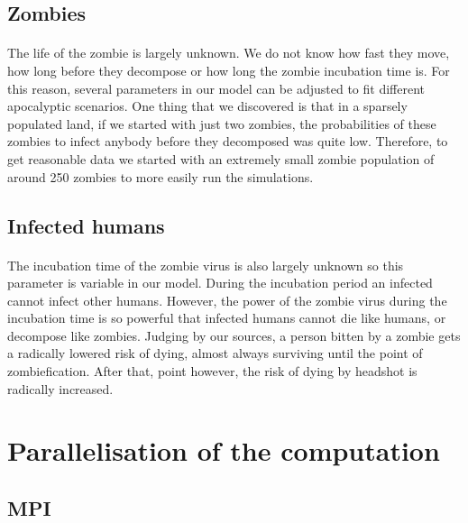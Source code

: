 \documentclass{article}
\begin{document}
\subsection{Zombies}
\paragraph{}
The life of the zombie is largely unknown. We do not know how fast they move, how long before they decompose or how long the zombie incubation time is. For this reason, several parameters in our model can be adjusted to fit different apocalyptic scenarios. One thing that we discovered is that in a sparsely populated land, if we started with just two zombies, the probabilities of these zombies to infect anybody before they decomposed was quite low. Therefore, to get reasonable data we started with an extremely small zombie population of around 250 zombies to more easily run the simulations.

\subsection{Infected humans}
\paragraph{}
The incubation time of the zombie virus is also largely unknown so this parameter is variable in our model. During the incubation period an infected cannot infect other humans. However, the power of the zombie virus during the incubation time is so powerful that infected humans cannot die like humans, or decompose like zombies. Judging by our sources\cite{deadheads}, a person bitten by a zombie gets a radically lowered risk of dying, almost always surviving until the point of zombiefication. After that, point however, the risk of dying by headshot is radically increased.

\newpage
\section{Parallelisation of the computation}
\subsection{MPI}
\end{document}
